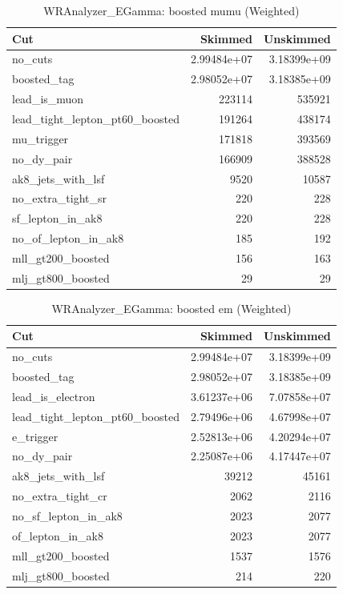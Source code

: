 \documentclass{article}
\begin{document}
\begin{table}[htbp]
\centering
\caption{WRAnalyzer\_EGamma: boosted mumu (Weighted)}
\begin{tabular}{lrr}
\hline
Cut & Skimmed & Unskimmed \\
\hline
no\_cuts & 2.99484e+07 & 3.18399e+09 \\
boosted\_tag & 2.98052e+07 & 3.18385e+09 \\
lead\_is\_muon & 223114 & 535921 \\
lead\_tight\_lepton\_pt60\_boosted & 191264 & 438174 \\
mu\_trigger & 171818 & 393569 \\
no\_dy\_pair & 166909 & 388528 \\
ak8\_jets\_with\_lsf & 9520 & 10587 \\
no\_extra\_tight\_sr & 220 & 228 \\
sf\_lepton\_in\_ak8 & 220 & 228 \\
no\_of\_lepton\_in\_ak8 & 185 & 192 \\
mll\_gt200\_boosted & 156 & 163 \\
mlj\_gt800\_boosted & 29 & 29 \\
\hline
\end{tabular}
\end{table}

\begin{table}[htbp]
\centering
\caption{WRAnalyzer\_EGamma: boosted em (Weighted)}
\begin{tabular}{lrr}
\hline
Cut & Skimmed & Unskimmed \\
\hline
no\_cuts & 2.99484e+07 & 3.18399e+09 \\
boosted\_tag & 2.98052e+07 & 3.18385e+09 \\
lead\_is\_electron & 3.61237e+06 & 7.07858e+07 \\
lead\_tight\_lepton\_pt60\_boosted & 2.79496e+06 & 4.67998e+07 \\
e\_trigger & 2.52813e+06 & 4.20294e+07 \\
no\_dy\_pair & 2.25087e+06 & 4.17447e+07 \\
ak8\_jets\_with\_lsf & 39212 & 45161 \\
no\_extra\_tight\_cr & 2062 & 2116 \\
no\_sf\_lepton\_in\_ak8 & 2023 & 2077 \\
of\_lepton\_in\_ak8 & 2023 & 2077 \\
mll\_gt200\_boosted & 1537 & 1576 \\
mlj\_gt800\_boosted & 214 & 220 \\
\hline
\end{tabular}
\end{table}
\end{document}
